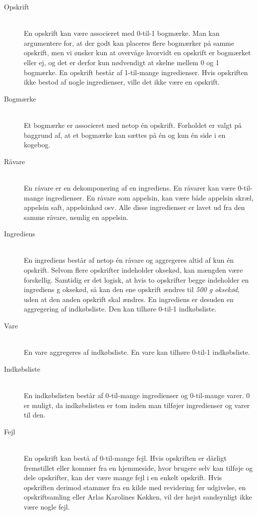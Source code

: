 \begin{description}
\item[Opskrift] \hfill \\
En opskrift kan være associeret med 0-til-1 bogmærke. Man kan argumentere for, at der godt kan placeres flere bogmærker på samme opskrift, men vi ønsker kun at overvåge hvorvidt en opskrift er bogmærket eller ej, og det er derfor kun nødvendigt at skelne mellem 0 og 1 bogmærke. En opskrift består af 1-til-mange ingredienser. Hvis opskriften ikke bestod af nogle ingredienser, ville det ikke være en opskrift.
    
\item[Bogmærke] \hfill \\
Et bogmærke er associeret med netop én opskrift. Forholdet er valgt på baggrund af, at et bogmærke kan sættes på én og kun én side i en kogebog.

\item[Råvare] \hfill \\
En råvare er en dekomponering af en ingrediens. En råvarer kan være 0-til-mange ingredienser. En råvare som \fx appelsin, kan være både appelsin skræl, appelsin saft, appelsinkød osv. Alle disse ingredienser er lavet ud fra den samme råvare, nemlig en appelsin. 

\item[Ingrediens] \hfill \\
En ingrediens består af netop én råvare og aggregeres altid af kun én opskrift. Selvom flere opskrifter indeholder oksekød, kan mængden være forskellig. Samtidig er det logisk, at hvis to opskrifter begge indeholder en ingrediens  g oksekød, så kan den ene opskrift ændres til \textit{500 g oksekød}, uden at den anden opskrift skal ændres. En ingrediens er desuden en aggregering af indkøbsliste. Den kan tilhøre 0-til-1 indkøbsliste.  

\item[Vare] \hfill \\
En vare aggregeres af indkøbsliste. En vare kan tilhøre 0-til-1 indkøbsliste.  
  
\item[Indkøbsliste] \hfill \\
En indkøbslisten består af 0-til-mange ingredienser og 0-til-mange varer. 0 er muligt, da indkøbslisten er tom inden man tilføjer ingredienser og varer til den.

\item[Fejl] \hfill \\
En opskrift kan bestå af 0-til-mange fejl. Hvis opskriften er dårligt fremstillet eller kommer fra en hjemmeside, hvor brugere selv kan tilføje og dele opskrifter, kan der \fx være mange fejl i en enkelt opskrift. Hvis opskriften derimod stammer fra en kilde med revidering før udgivelse, \fx en opskriftsamling eller Arlas Karolines Køkken, vil der højst sandsynligt ikke være nogle fejl.

\end{description}

